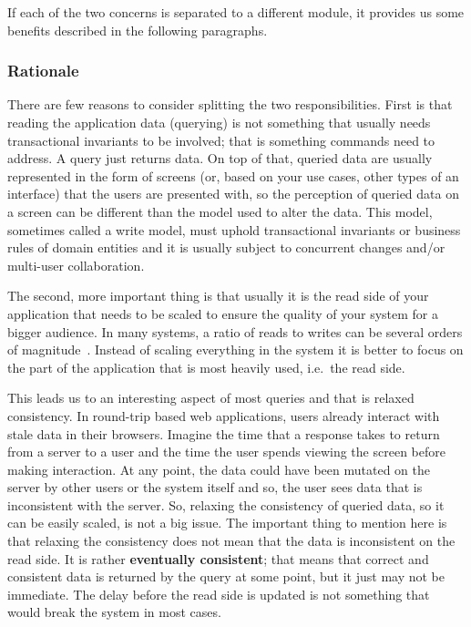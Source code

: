\documentclass{book}
\begin{document}
If each of the two concerns is separated to a different module, it
provides us some benefits described in the following paragraphs.

\subsubsection{Rationale}\label{rationale}

There are few reasons to consider splitting the two responsibilities.
First is that reading the application data (querying) is not something
that usually needs transactional invariants to be involved; that is
something commands need to address. A query just returns data. On top of
that, queried data are usually represented in the form of screens (or,
based on your use cases, other types of an interface) that the users are
presented with, so the perception of queried data on a screen can be
different than the model used to alter the data. This model, sometimes
called a write model, must uphold transactional invariants or business
rules of domain entities and it is usually subject to concurrent changes
and/or multi-user collaboration.

The second, more important thing is that usually it is the read side of
your application that needs to be scaled to ensure the quality of your
system for a bigger audience. In many systems, a ratio of reads to
writes can be several orders of magnitude~\cite{cap}. Instead of scaling
everything in the system it is better to focus on the part of the
application that is most heavily used, i.e.~the read side.

This leads us to an interesting aspect of most queries and that is
relaxed consistency. In round-trip based web applications, users already
interact with stale data in their browsers. Imagine the time that a
response takes to return from a server to a user and the time the user
spends viewing the screen before making interaction. At any point, the
data could have been mutated on the server by other users or the system
itself and so, the user sees data that is inconsistent with the server.
So, relaxing the consistency of queried data, so it can be easily
scaled, is not a big issue. The important thing to mention here is that
relaxing the consistency does not mean that the data is inconsistent on
the read side. It is rather \textbf{eventually consistent}; that means
that correct and consistent data is returned by the query at some point,
but it just may not be immediate. The delay before the read side is
updated is not something that would break the system in most cases.
\end{document}
